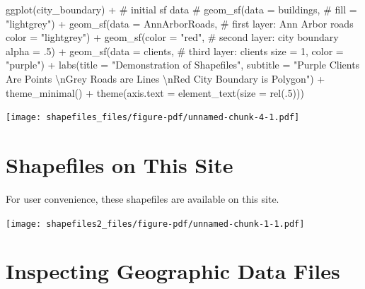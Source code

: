 \documentclass[
  letterpaper,
  DIV=11,
  numbers=noendperiod,
  oneside]{scrreprt}
\newenvironment{Shaded}{\begin{snugshade}}{\end{snugshade}}
\newcommand{\AttributeTok}[1]{\textcolor[rgb]{0.40,0.45,0.13}{#1}}
\newcommand{\CommentTok}[1]{\textcolor[rgb]{0.37,0.37,0.37}{#1}}
\newcommand{\DecValTok}[1]{\textcolor[rgb]{0.68,0.00,0.00}{#1}}
\newcommand{\FunctionTok}[1]{\textcolor[rgb]{0.28,0.35,0.67}{#1}}
\newcommand{\NormalTok}[1]{\textcolor[rgb]{0.00,0.23,0.31}{#1}}
\newcommand{\SpecialCharTok}[1]{\textcolor[rgb]{0.37,0.37,0.37}{#1}}
\newcommand{\StringTok}[1]{\textcolor[rgb]{0.13,0.47,0.30}{#1}}
\begin{document}
\begin{Shaded}
\begin{Highlighting}[]
\FunctionTok{ggplot}\NormalTok{(city\_boundary) }\SpecialCharTok{+} \CommentTok{\# initial sf data}
  \CommentTok{\# geom\_sf(data = buildings,}
  \CommentTok{\#         fill = "lightgrey") +}
  \FunctionTok{geom\_sf}\NormalTok{(}\AttributeTok{data =}\NormalTok{ AnnArborRoads, }\CommentTok{\# first layer: Ann Arbor roads }
          \AttributeTok{color =} \StringTok{"lightgrey"}\NormalTok{) }\SpecialCharTok{+}
  \FunctionTok{geom\_sf}\NormalTok{(}\AttributeTok{color =} \StringTok{"red"}\NormalTok{, }\CommentTok{\# second layer: city boundary}
          \AttributeTok{alpha =}\NormalTok{ .}\DecValTok{5}\NormalTok{) }\SpecialCharTok{+} 
  \FunctionTok{geom\_sf}\NormalTok{(}\AttributeTok{data =}\NormalTok{ clients, }\CommentTok{\# third layer: clients}
          \AttributeTok{size =} \DecValTok{1}\NormalTok{,}
          \AttributeTok{color =} \StringTok{"purple"}\NormalTok{) }\SpecialCharTok{+}
  \FunctionTok{labs}\NormalTok{(}\AttributeTok{title =} \StringTok{"Demonstration of Shapefiles"}\NormalTok{,}
       \AttributeTok{subtitle =} \StringTok{"Purple Clients Are Points }\SpecialCharTok{\textbackslash{}n}\StringTok{Grey Roads are Lines }\SpecialCharTok{\textbackslash{}n}\StringTok{Red City Boundary is Polygon"}\NormalTok{) }\SpecialCharTok{+}
  \FunctionTok{theme\_minimal}\NormalTok{() }\SpecialCharTok{+}
  \FunctionTok{theme}\NormalTok{(}\AttributeTok{axis.text =} \FunctionTok{element\_text}\NormalTok{(}\AttributeTok{size =} \FunctionTok{rel}\NormalTok{(.}\DecValTok{5}\NormalTok{)))}
\end{Highlighting}
\end{Shaded}

\texttt{[image: shapefiles\_files/figure-pdf/unnamed-chunk-4-1.pdf]}

\chapter{Shapefiles on This Site}\label{sec-shapefiles2}

For user convenience, these shapefiles are available on this site.

\texttt{[image: shapefiles2\_files/figure-pdf/unnamed-chunk-1-1.pdf]}

\chapter{Inspecting Geographic Data Files}\label{sec-inspecting}
\end{document}
